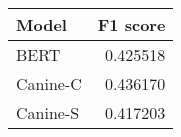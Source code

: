 \begin{tabular}{lr}
\toprule
   Model &  F1 score \\
\midrule
    BERT &  0.425518 \\
Canine-C &  0.436170 \\
Canine-S &  0.417203 \\
\bottomrule
\end{tabular}
